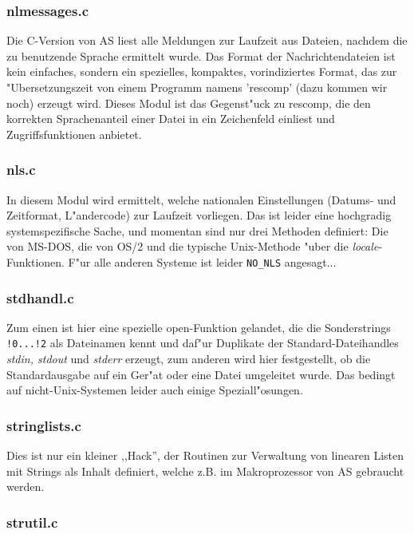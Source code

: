 \documentclass[12pt,a4paper,twoside]{report}
\begin{document}
\subsubsection{nlmessages.c}

Die C-Version von AS liest alle Meldungen zur Laufzeit aus Dateien, nachdem
die zu benutzende Sprache ermittelt wurde.  Das Format der
Nachrichtendateien ist kein einfaches, sondern ein spezielles, kompaktes,
vorindiziertes Format, das zur "Ubersetzungszeit von einem Programm namens
'rescomp' (dazu kommen wir noch) erzeugt wird.  Dieses Modul ist das
Gegenst"uck zu rescomp, die den korrekten Sprachenanteil einer Datei in ein
Zeichenfeld einliest und Zugriffsfunktionen anbietet.

\subsubsection{nls.c}

In diesem Modul wird ermittelt, welche nationalen Einstellungen (Datums-
und Zeitformat, L"andercode) zur Laufzeit vorliegen.  Das ist leider eine
hochgradig systemspezifische Sache, und momentan sind nur drei Methoden
definiert: Die von MS-DOS, die von OS/2 und die typische Unix-Methode
"uber die {\em locale}-Funktionen.  F"ur alle anderen Systeme ist leider
\verb!NO_NLS! angesagt...

\subsubsection{stdhandl.c}

Zum einen ist hier eine spezielle open-Funktion gelandet, die die
Sonderstrings {\tt !0...!2} als Dateinamen kennt und daf"ur Duplikate der
Standard-Dateihandles {\em stdin, stdout} und {\em stderr} erzeugt, zum
anderen wird hier festgestellt, ob die Standardausgabe auf ein Ger"at oder
eine Datei umgeleitet wurde.  Das bedingt auf nicht-Unix-Systemen leider
auch einige Speziall"osungen.

\subsubsection{stringlists.c}

Dies ist nur ein kleiner ,,Hack'', der Routinen zur Verwaltung von linearen
Listen mit Strings als Inhalt definiert, welche z.B. im Makroprozessor von
AS gebraucht werden.

\subsubsection{strutil.c}
\end{document}
